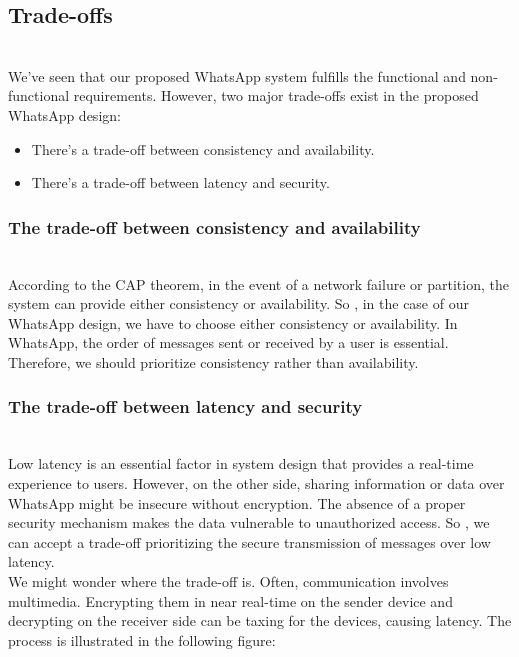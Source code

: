 \subsection{Trade-offs}\label{ORCxt4Ofks1hYkAt-vSH8}
\\
We've seen that our proposed WhatsApp system fulfills the functional and non-functional requirements. However, two major trade-offs exist in the proposed WhatsApp design:

\begin{itemize}
\item
\protect{}\label{YXSWSEsWbr8PMkZRfKWfK}
There's a trade-off between consistency and availability.
\item
\protect{}\label{9MQzI4z71aDkb1pqkLHpq}
There's a trade-off between latency and security.
\end{itemize}

\subsubsection{The trade-off between consistency and availability}\label{YazSUPP2d8Z-s7rnCnvbU}
\\
According to the CAP theorem, in the event of a network failure or partition, the system can provide either consistency or availability. So , in the case of our WhatsApp design, we have to choose either consistency or availability. In
WhatsApp, the order of messages sent or received by a user is essential. Therefore, we should prioritize consistency rather than availability.

\subsubsection{The trade-off between latency and security}\label{zNABtu0z_P1OK6y4K74hv}
\\
Low latency is an essential factor in system design that provides a real-time experience to users. However, on the other side, sharing information or data over WhatsApp might be insecure without encryption. The absence of a proper security mechanism makes the data vulnerable to unauthorized access. So , we can accept a trade-off prioritizing the secure transmission of messages over low latency.
\\
\hfill\break
We might wonder where the trade-off is. Often, communication involves multimedia. Encrypting them in near real-time on the sender device and decrypting on the receiver side can be taxing for the devices, causing latency. The process is illustrated in the following figure:

